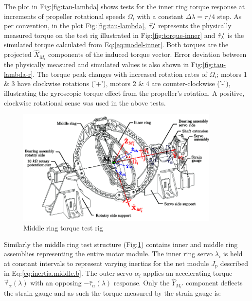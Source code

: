 \par
The plot in Fig:\ref{fig:tau-lambda} shows tests for the inner ring torque response at increments of propeller rotational speeds $\Omega_i$ with a constant $\Delta\lambda=\pi/4$ step. As per convention, in the plot Fig:\ref{fig:tau-lambda}, $\vec{\tau}_\lambda\text{}\hspace{-2pt}'$ represents the physically measured torque on the test rig illustrated in Fig:\ref{fig:torque-inner} and $\hat{\tau}_\lambda\text{}\hspace{-2pt}'$ is the simulated torque calculated from Eq:\ref{eq:model-inner}. Both torques are the projected $\hat{X}_{M_i}$ components of the induced torque vector. Error deviation between the physically measured and simulated values is also shown in Fig:\ref{fig:tau-lambda-r}. The torque peak changes with increased rotation rates of $\Omega_i$; motors 1 \& 3 have clockwise rotations ('+'), motors 2 \& 4 are counter-clockwise ('-'), illustrating the gyroscopic torque effect from the propeller's rotation. A positive, clockwise rotational sense was used in the above tests. 
\par
\begin{figure}[htbp]
\centering
\includegraphics[width=0.9\textwidth]{figs/torque-middle}
\caption{Middle ring torque test rig}
\label{fig:torque-middle}
\vspace{-6pt}
\end{figure}
Similarly the middle ring test structure (Fig:\ref{fig:torque-middle}) contains inner and middle ring assemblies representing the entire motor module. The inner ring servo $\lambda_i$ is held at constant intervals to represent varying inertias for the net module $J_\text{p}$ described in Eq:\ref{eq:inertia.middle.b}. The outer servo $\alpha_i$ applies an accelerating torque $\vec{\tau}_\alpha(\lambda)$ with an opposing $-\hat{\tau}_\alpha(\lambda)$ response. Only the $\hat{Y}_{M_i'}$ component deflects the strain gauge and as such the torque measured by the strain gauge is:

